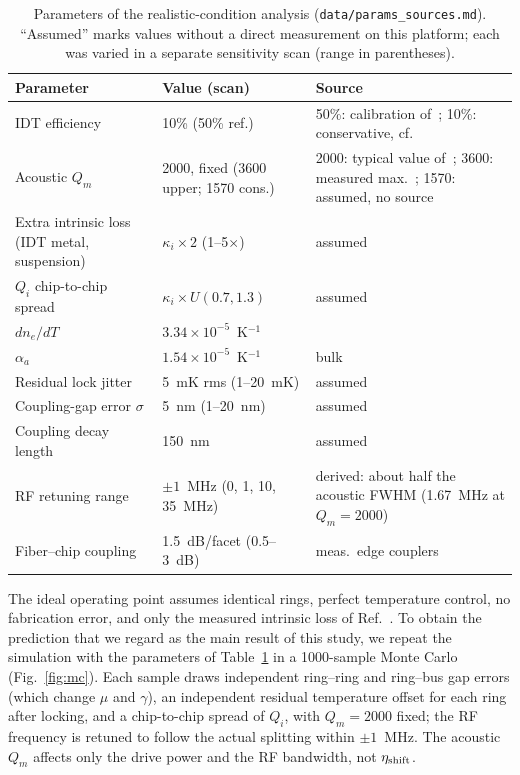 \documentclass[aps,prapplied,reprint,superscriptaddress,amsmath,amssymb,floatfix]{revtex4-2}
\newcommand{\etash}{\eta_{\rm shift}}
\begin{document}
\begin{table}[t]
\caption{Parameters of the realistic-condition analysis (\texttt{data/params\_sources.md}). ``Assumed'' marks values without a direct measurement on this platform; each was varied in a separate sensitivity scan (range in parentheses).}
\label{tab:real}
\begin{ruledtabular}
\footnotesize
\begin{tabular}{p{}p{}p{}}
Parameter & Value (scan) & Source \\
\hline
IDT efficiency & 10\% (50\% ref.) & 50\%: calibration of~\cite{Shao2019}; 10\%: conservative, cf.~\cite{Xu2025b}\\
Acoustic $Q_m$ & 2000, fixed (3600 upper; 1570 cons.) & 2000: typical value of~\cite{Shao2019}; 3600: measured max.~\cite{Shao2019}; 1570: assumed, no source\\
Extra intrinsic loss (IDT metal, suspension) & $\kappa_i\times2$ (1--5$\times$) & assumed\\
$Q_i$ chip-to-chip spread & $\kappa_i\times U(0.7,1.3)$ & assumed\\
$dn_e/dT$ & $3.34\times10^{-5}$~K$^{-1}$ & \cite{Moretti2005}\\
$\alpha_a$ & $1.54\times10^{-5}$~K$^{-1}$ & bulk~\cite{KimSmith1969}\\
Residual lock jitter & 5~mK rms (1--20~mK) & assumed\\
Coupling-gap error $\sigma$ & 5~nm (1--20~nm) & assumed\\
Coupling decay length & 150~nm & assumed\\
RF retuning range & $\pm1$~MHz (0, 1, 10, 35~MHz) & derived: about half the acoustic FWHM (1.67~MHz at $Q_m=2000$)\\
Fiber--chip coupling & 1.5~dB/facet (0.5--3~dB) & meas.\ edge couplers~\cite{Jia2023,HuC2020edge}\\
\end{tabular}
\end{ruledtabular}
\end{table}

The ideal operating point assumes identical rings, perfect temperature control, no fabrication error, and only the measured intrinsic loss of Ref.~\cite{Shao2019}. To obtain the prediction that we regard as the main result of this study, we repeat the simulation with the parameters of Table~\ref{tab:real} in a 1000-sample Monte Carlo (Fig.~\ref{fig:mc}). Each sample draws independent ring--ring and ring--bus gap errors (which change $\mu$ and $\gamma$), an independent residual temperature offset for each ring after locking, and a chip-to-chip spread of $Q_i$, with $Q_m=2000$ fixed; the RF frequency is retuned to follow the actual splitting within $\pm1$~MHz. The acoustic $Q_m$ affects only the drive power and the RF bandwidth, not $\etash$.
\end{document}
